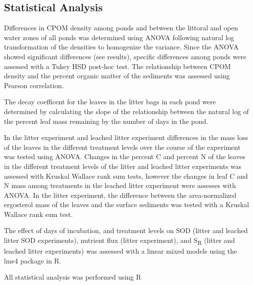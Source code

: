 \subsection{Statistical Analysis}

Differences in CPOM density among ponds and between the littoral and open water zones of all ponds was determined using ANOVA following natural log transformation of the densities to homogenize the variance. Since the ANOVA showed significant differences (see results), specific differences among ponds were assessed with a Tukey HSD post-hoc test. The relationship between CPOM density and the percent organic matter of the sediments was assessed using Pearson correlation.

The decay coefficent for the leaves in the litter bags in each pond were determined by calculating the slope of the relationship between the natural log of the percent leaf mass remaining by the number of days in the pond.

In the litter experiment and leached litter experiment differences in the mass loss of the leaves in the different treatment levels over the course of the experiment was tested using ANOVA. Changes in the percent C and percent N of the leaves in the different treatment levels of the litter and leached litter experiments was assessed with Kruskal Wallace rank sum tests, however the changes in leaf C and N mass among treatments in the leached litter experiment were assesses with ANOVA. In the litter experiment, the difference between the area-normalized ergosterol mass of the leaves and the surface sediments was tested with a Kruskal Wallace rank sum test.

The effect of days of incubation, and treatment levels on SOD (litter and leached litter SOD experiments), nutrient flux (litter experiment), and S\textsubscript{R} (litter and leached litter experiments) was assessed with a linear mixed models using the lme4 package \cite{lme4} in R.

All statistical analysis was performed using R \cite{R}

